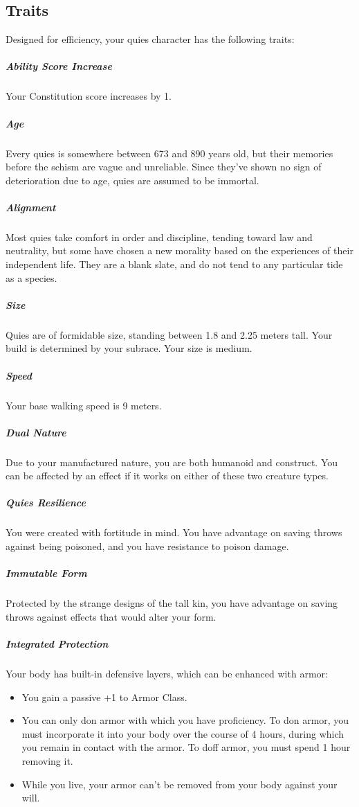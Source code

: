 \begin{linenumbers}
\subsection*{Traits}
Designed for efficiency, your quies character has the following traits:
\subparagraph{Ability Score Increase} Your Constitution score increases by 1.
\subparagraph{Age} Every quies is somewhere between 673 and 890 years old, but their memories before the schism are vague and unreliable.
Since they've shown no sign of deterioration due to age, quies are assumed to be immortal.
\subparagraph{Alignment} Most quies take comfort in order and discipline, tending toward law and neutrality, but some have chosen a new morality based on the experiences of their independent life.
They are a blank slate, and do not tend to any particular tide as a species.
\subparagraph{Size} Quies are of formidable size, standing between 1.8 and 2.25 meters tall.
Your build is determined by your subrace.
Your size is medium.
\subparagraph{Speed} Your base walking speed is 9 meters.
\subparagraph{Dual Nature} Due to your manufactured nature, you are both humanoid and construct.
You can be affected by an effect if it works on either of these two creature types.
\subparagraph{Quies Resilience} You were created with fortitude in mind.
You have advantage on saving throws against being poisoned, and you have resistance to poison damage.
\subparagraph{Immutable Form} Protected by the strange designs of the tall kin, you have advantage on saving throws against effects that would alter your form.
\subparagraph{Integrated Protection} Your body has built-in defensive layers, which can be enhanced with armor:
\end{linenumbers}
\begin{itemize}
    \item You gain a passive +1 to Armor Class.
    \item You can only don armor with which you have proficiency.
    To don armor, you must incorporate it into your body over the course of 4 hours, during which you remain in contact with the armor.
    To doff armor, you must spend 1 hour removing it.
    \item While you live, your armor can't be removed from your body against your will.
\end{itemize}
